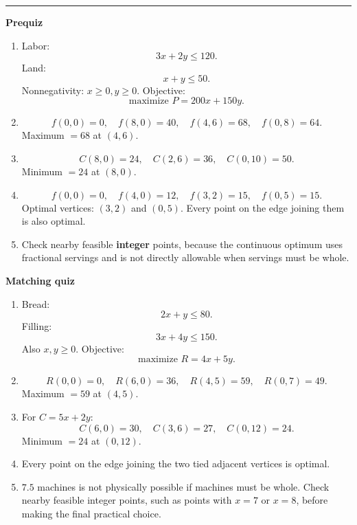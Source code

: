 \documentclass[10pt]{article}
\newcommand{\modulekey}[2]{\clearpage{\Large\bfseries\textcolor{olive}{Module #1: #2 — Answer Key}}\par\textcolor{gold}{\rule{\linewidth}{1.2pt}}\par}
\begin{document}
\modulekey{9}{Linear Programming}
\textbf{Prequiz}
\begin{enumerate}
\item Labor:
\[
\boxed{3x+2y\le120}.
\]
Land:
\[
\boxed{x+y\le50}.
\]
Nonnegativity: \(\boxed{x\ge0,y\ge0}\). Objective:
\[
\boxed{\text{maximize }P=200x+150y}.
\]
\item
\[
f(0,0)=0,\quad f(8,0)=40,\quad f(4,6)=68,\quad f(0,8)=64.
\]
Maximum \(=\boxed{68}\) at \(\boxed{(4,6)}\).
\item
\[
C(8,0)=24,\quad C(2,6)=36,\quad C(0,10)=50.
\]
Minimum \(=\boxed{24}\) at \(\boxed{(8,0)}\).
\item
\[
f(0,0)=0,\quad f(4,0)=12,\quad f(3,2)=15,\quad f(0,5)=15.
\]
Optimal vertices: \(\boxed{(3,2)}\) and \(\boxed{(0,5)}\). Every point on the edge joining them is also optimal.
\item Check nearby feasible \textbf{integer} points, because the continuous optimum uses fractional servings and is not directly allowable when servings must be whole.
\end{enumerate}

\textbf{Matching quiz}
\begin{enumerate}
\item Bread:
\[
\boxed{2x+y\le80}.
\]
Filling:
\[
\boxed{3x+4y\le150}.
\]
Also \(x,y\ge0\). Objective:
\[
\boxed{\text{maximize }R=4x+5y}.
\]
\item
\[
R(0,0)=0,\quad R(6,0)=36,\quad R(4,5)=59,\quad R(0,7)=49.
\]
Maximum \(=\boxed{59}\) at \(\boxed{(4,5)}\).
\item For \(C=5x+2y\):
\[
C(6,0)=30,\quad C(3,6)=27,\quad C(0,12)=24.
\]
Minimum \(=\boxed{24}\) at \(\boxed{(0,12)}\).
\item Every point on the edge joining the two tied adjacent vertices is optimal.
\item \(7.5\) machines is not physically possible if machines must be whole. Check nearby feasible integer points, such as points with \(x=7\) or \(x=8\), before making the final practical choice.
\end{enumerate}
\end{document}
